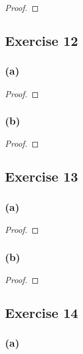 \documentclass[14pt]{extarticle}
\begin{document}
\begin{proof}

\end{proof}

\subsection{Exercise 12}

\subsubsection{(a)}

\begin{proof}

\end{proof}

\subsubsection{(b)}

\begin{proof}

\end{proof}

\subsection{Exercise 13}

\subsubsection{(a)}

\begin{proof}

\end{proof}

\subsubsection{(b)}

\begin{proof}

\end{proof}

\subsection{Exercise 14}

\subsubsection{(a)}
\end{document}
